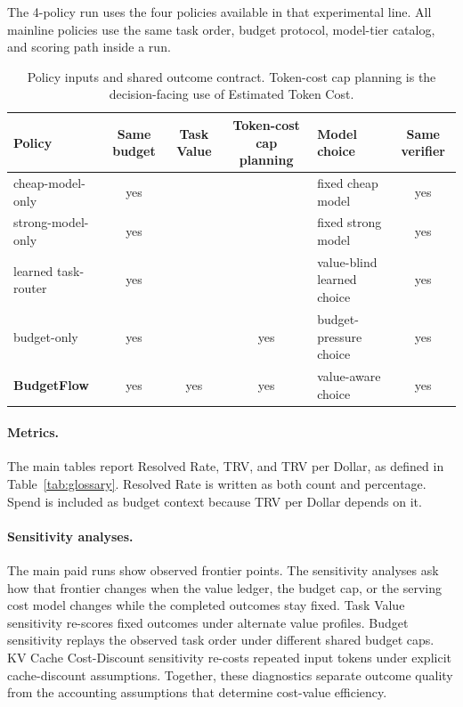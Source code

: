 \documentclass[sigconf,review,anonymous]{acmart}
\newcommand{\method}{BudgetFlow\xspace}
\newcommand{\trv}{TRV\xspace}
\begin{document}
The 4-policy run uses the four policies available in that experimental line. All mainline policies use the same task order, budget protocol, model-tier catalog, and scoring path inside a run.

\begin{table}[t]
\centering
\small
\begin{tabular}{lccclc}
\toprule
Policy & Same budget & \textbf{Task Value} & Token-cost cap planning & Model choice & Same verifier \\
\midrule
cheap-model-only & yes &  &  & fixed cheap model & yes \\
strong-model-only & yes &  &  & fixed strong model & yes \\
learned task-router & yes &  &  & value-blind learned choice & yes \\
budget-only & yes &  & yes & budget-pressure choice & yes \\
\textbf{\method} & yes & yes & yes & value-aware choice & yes \\
\bottomrule
\end{tabular}
\caption{Policy inputs and shared outcome contract. Token-cost cap planning is the decision-facing use of Estimated Token Cost.}
\label{tab:policies}
\end{table}

\paragraph{Metrics.}
The main tables report Resolved Rate, \trv, and \trv per Dollar, as defined in Table~\ref{tab:glossary}. Resolved Rate is written as both count and percentage. Spend is included as budget context because \trv per Dollar depends on it.

\paragraph{Sensitivity analyses.}
The main paid runs show observed frontier points. The sensitivity analyses ask how that frontier changes when the value ledger, the budget cap, or the serving cost model changes while the completed outcomes stay fixed. Task Value sensitivity re-scores fixed outcomes under alternate value profiles. Budget sensitivity replays the observed task order under different shared budget caps. KV Cache Cost-Discount sensitivity re-costs repeated input tokens under explicit cache-discount assumptions. Together, these diagnostics separate outcome quality from the accounting assumptions that determine cost-value efficiency.
\end{document}

